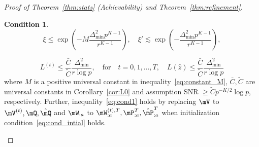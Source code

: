 \documentclass[lettersize,onecolumn,journal]{IEEEtran}
\theoremstyle{definition}
\theoremstyle{definition}
\newtheorem{condition}{Condition}
\newcommand{\of}[1]{\left(#1\right)}
\begin{document}
\begin{proof}[Proof of Theorem~\ref{thm:stats} (Achievability) and Theorem~\ref{thm:refinement}]
{\begin{condition}
\begin{equation}\label{eq:cond_oracle}
    \xi \leq \exp\of{ - M \frac{\Delta_{\min}^2 p^{K-1}}{r^{K-1}}}, \quad  \xi' \lesssim \exp\of{ -  \frac{\Delta_{\min}^2 p^{K-1}}{r^{K-1}}},
\end{equation}

\begin{equation}\label{eq:cond_intial}
    L^{(t)} \leq \frac{\bar C}{\tilde C} \frac{\Delta_{\min}^2}{r \log p}, \quad \text{for} \quad t = 0, 1, \ldots, T, \quad  L(\hat z) \leq \frac{\bar C}{\tilde C} \frac{\Delta_{\min}^2}{r \log p}
\end{equation}
where $M$ is a positive universal constant in inequality~\eqref{eq:constant_M}, $\bar C, \tilde C$ are universal constants in Corollary~\ref{cor:L0} and assumption SNR $\geq \tilde C p^{-K/2} \log p$, respectively. Further, inequality~\eqref{eq:cond1} holds by replacing $\mV$ to $\mV^{(t)}, \mQ, \hat \mQ$ and $\mW_{:a}$ to $\mW_{:a}^{(t),T}, \mP_{:a}^T, \hat \mP_{:a}^T$ when initialization condition~\eqref{eq:cond_intial} holds.
\end{condition}



}


\end{proof}
\end{document}
